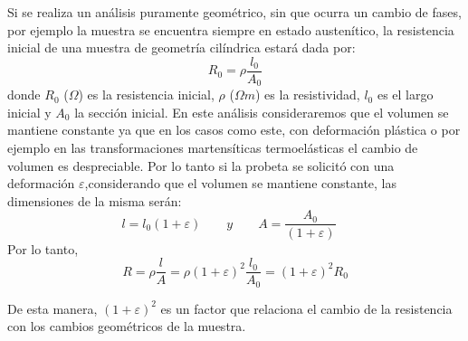 \documentclass[a4paper,12pt,fleqn,twoside,openany]{book}
\begin{document}
Si se realiza un análisis puramente geométrico, sin que ocurra un cambio de fases, por ejemplo la muestra se encuentra siempre en estado austenítico, la resistencia inicial de una muestra de geometría cilíndrica estará dada por:
\begin{equation}
 R_0= \rho \frac{l_0}{A_0}
\end{equation}
donde $R_0$ ($\Omega$) es la resistencia inicial, $\rho$ ($\Omega m$) es la resistividad, $l_0$ es el largo inicial y $A_0$ la sección inicial. En este análisis consideraremos que el volumen se mantiene constante ya que en los casos como este, con deformación plástica o por ejemplo en las transformaciones martensíticas termoelásticas el cambio de volumen es despreciable. Por lo tanto si la probeta se solicitó con una deformación $\varepsilon$,considerando que el volumen se mantiene constante, las dimensiones de la misma serán: 
\begin{equation*}
 l=l_0  (1+ \varepsilon)
  \quad \quad y \quad \quad  
 A=\frac{A_0}{(1+ \varepsilon)} \quad 
\end{equation*}
Por lo tanto, 
\begin{equation}
R= \rho \frac{l}{A} = \rho (1+\varepsilon)^2 \frac{l_0}{A_0} = (1+\varepsilon)^2 R_0 %
\end{equation}

De esta manera, $(1+\varepsilon)^2$ es un factor que relaciona el cambio de la resistencia con los cambios geométricos de la muestra. 
\end{document}
